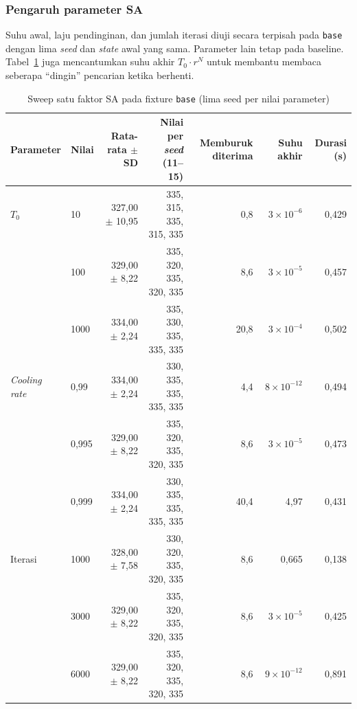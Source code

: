 \subsubsection{Pengaruh parameter SA}

Suhu awal, laju pendinginan, dan jumlah iterasi diuji secara terpisah pada \texttt{base} dengan lima \textit{seed} dan \textit{state} awal yang sama. Parameter lain tetap pada baseline. Tabel~\ref{tab:sa-parameter-sweeps} juga mencantumkan suhu akhir $T_0\cdot r^{N}$ untuk membantu membaca seberapa ``dingin'' pencarian ketika berhenti.

\begin{table}[H]
    \centering
    \small
    \caption{Sweep satu faktor SA pada fixture \texttt{base} (lima seed per nilai parameter)}
    \label{tab:sa-parameter-sweeps}
    \begin{tabular}{@{}llrrrrr@{}}
        \toprule
        Parameter             & Nilai & Rata-rata $\pm$ SD & Nilai per \textit{seed} (11--15) & Memburuk diterima & Suhu akhir        & Durasi (s) \\
        \midrule
        $T_0$                 & 10    & 327,00 $\pm$ 10,95 & 335, 315, 335, 315, 335          & 0,8               & $3\times10^{-6}$  & 0,429      \\
                              & 100   & 329,00 $\pm$ 8,22  & 335, 320, 335, 320, 335          & 8,6               & $3\times10^{-5}$  & 0,457      \\
                              & 1000  & 334,00 $\pm$ 2,24  & 335, 330, 335, 335, 335          & 20,8              & $3\times10^{-4}$  & 0,502      \\
        \midrule
        \textit{Cooling rate} & 0,99  & 334,00 $\pm$ 2,24  & 330, 335, 335, 335, 335          & 4,4               & $8\times10^{-12}$ & 0,494      \\
                              & 0,995 & 329,00 $\pm$ 8,22  & 335, 320, 335, 320, 335          & 8,6               & $3\times10^{-5}$  & 0,473      \\
                              & 0,999 & 334,00 $\pm$ 2,24  & 330, 335, 335, 335, 335          & 40,4              & 4,97              & 0,431      \\
        \midrule
        Iterasi               & 1000  & 328,00 $\pm$ 7,58  & 330, 320, 335, 320, 335          & 8,6               & 0,665             & 0,138      \\
                              & 3000  & 329,00 $\pm$ 8,22  & 335, 320, 335, 320, 335          & 8,6               & $3\times10^{-5}$  & 0,425      \\
                              & 6000  & 329,00 $\pm$ 8,22  & 335, 320, 335, 320, 335          & 8,6               & $9\times10^{-12}$ & 0,891      \\
        \bottomrule
    \end{tabular}
\end{table}


